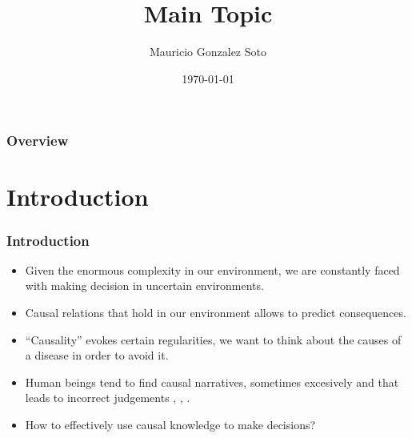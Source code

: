 \documentclass{beamer}
\title[Short title]{Main Topic } %
\author{Mauricio Gonzalez Soto} %
\institute[INAOE] %
{
Instituto Nacional de Astrofísica Óptica y Electrónica \\ %
\medskip
\textit{mauricio@inaoep.mx} %
}
\date{\today} %
\theoremstyle{plain}
\begin{document}
\begin{frame}
\titlepage %
\end{frame}

\begin{frame}[allowframebreaks]
\frametitle{Overview} %
\tableofcontents %
\end{frame}


\section{Introduction} 
\begin{frame}
\frametitle{Introduction}
\begin{itemize}
\item Given the enormous complexity in our environment, we are constantly faced with making decision in uncertain environments.
\item Causal relations that hold in our environment allows to predict consequences.
\item “Causality” evokes certain regularities, we want to think about the causes of a disease in order to avoid it. 
\item Human beings tend to find causal narratives, sometimes excesively and that leads to incorrect judgements \cite{tversky1977causal}, \cite{tversky1980causal}, \cite{kahneman2011thinking}.
\item How to effectively use causal knowledge to make decisions?
\end{itemize}
\end{frame}
\end{document}
